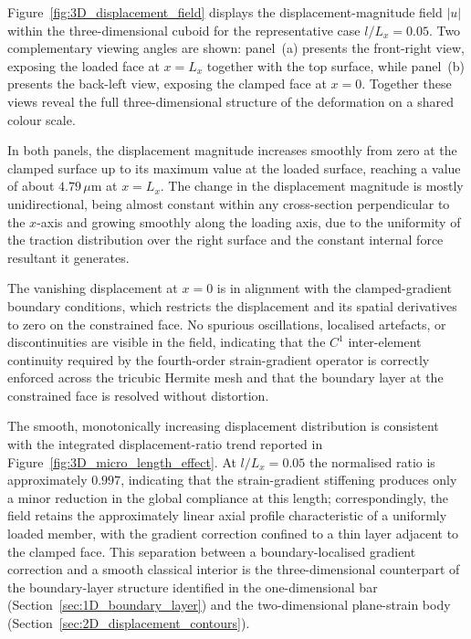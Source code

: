 \documentclass[final,3p,times,fleqn]{elsarticle}
\begin{document}
Figure~\ref{fig:3D_displacement_field} displays the
displacement-magnitude field $|u|$ within the three-dimensional cuboid
for the representative case $l/L_{x}=0.05$.
Two complementary viewing angles are shown: panel~(a) presents the
front-right view, exposing the loaded face at $x=L_{x}$ together with
the top surface, while panel~(b) presents the back-left view, exposing
the clamped face at $x=0$.
Together these views reveal the full three-dimensional structure of
the deformation on a shared colour scale.


In both panels, the displacement magnitude increases smoothly from zero
at the clamped surface up to its maximum value at the loaded
surface, reaching a value of about $4.79\,\mu\mathrm{m}$ at $x=L_{x}$.
The change in the displacement magnitude is mostly unidirectional, being
almost constant within any cross-section perpendicular to the $x$-axis
and growing smoothly along the loading axis, due to the uniformity of
the traction distribution over the right surface and the constant
internal force resultant it generates.

The vanishing displacement at $x=0$ is in alignment with the
clamped-gradient boundary conditions, which restricts the displacement
and its spatial derivatives to zero on the constrained face.
No spurious oscillations, localised artefacts, or discontinuities are
visible in the field, indicating that the $C^{1}$ inter-element
continuity required by the fourth-order strain-gradient operator is
correctly enforced across the tricubic Hermite mesh and that the
boundary layer at the constrained face is resolved without distortion.





The smooth, monotonically increasing displacement distribution is
consistent with the integrated displacement-ratio trend reported in
Figure~\ref{fig:3D_micro_length_effect}.
At $l/L_{x}=0.05$ the normalised ratio is approximately $0.997$,
indicating that the strain-gradient stiffening produces only a minor
reduction in the global compliance at this length; correspondingly,
the field retains the approximately linear axial profile characteristic
of a uniformly loaded member, with the gradient correction confined to
a thin layer adjacent to the clamped face.
This separation between a boundary-localised gradient correction and a
smooth classical interior is the three-dimensional counterpart of the
boundary-layer structure identified in the one-dimensional bar
(Section~\ref{sec:1D_boundary_layer}) and the two-dimensional plane-strain body
(Section~\ref{sec:2D_displacement_contours}).
\end{document}

